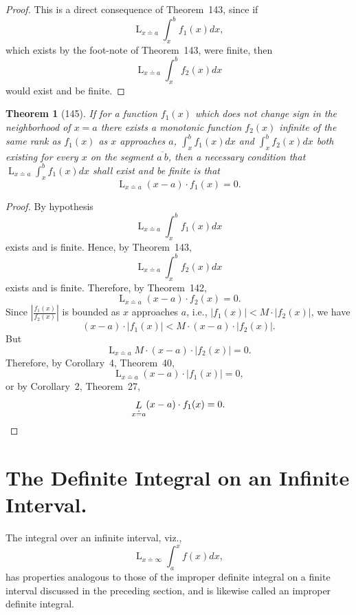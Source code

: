 \documentclass[a4paper,12pt]{book}[2004/02/16]
\providecommand{\hyperlink}[2]{#2}
\providecommand{\hypertarget}[2]{#2}
\theoremstyle{ilemma}
\theoremstyle{itheorem}
\newtheorem{theorem}{Theorem}
\theoremstyle{iother}
\theoremstyle{icorollary}
\theoremstyle{numcorollary}
\theoremstyle{idefinition}
\renewcommand{\dfrac}[2]{\frac{#1}{#2}}%
\begin{document}
\begin{proof}
This is a direct consequence of Theorem~\hyperlink{thm143}{143}, since if
\[
  \mathop{L}_{x\doteq a}\int_x^bf_1(x)dx,
\]
which exists by the foot-note of Theorem~\hyperlink{thm143}{143}, were finite, then
\[
  \mathop{L}_{x\doteq a}\int_x^bf_2(x)dx
\]
would exist and be finite.
\end{proof}

\begin{theorem}[145]\hypertarget{thm145}{}
If for a function $f_1(x)$ which does not change sign in the
neighborhood of $x=a$ there exists a monotonic function $f_2(x)$
infinite of the same rank as $f_1(x)$ as $x$ approaches $a$,
$\displaystyle \int_x^bf_1(x)dx$ and $\displaystyle \int_x^bf_2(x)dx$
both existing for every $x$ on the segment $\overline{a\ b}$, then a
necessary condition that $\displaystyle \mathop{L}_{x\doteq
a}\int_x^bf_1(x)dx$ shall exist and be finite is that
\[
  \mathop{L}_{x\doteq a}(x-a)\cdot f_1(x)=0.
\]
\end{theorem}

\begin{proof}
By hypothesis
\[
  \mathop{L}_{x\doteq a}\int_x^bf_1(x)dx
\]
exists and is finite. Hence, by Theorem~\hyperlink{thm143}{143},
\[
  \mathop{L}_{x\doteq a}\int_x^bf_2(x)dx
\]
exists and is finite. Therefore, by Theorem~\hyperlink{thm142}{142},
\[
  \mathop{L}_{x\doteq a}(x-a)\cdot f_2(x)=0.
\]
Since $ \left|\dfrac{f_1(x)}{f_2(x)}\right|$ is bounded as $x$
approaches $a$, i.e., $|f_1(x)|<M\cdot|f_2(x)|$, we have
\[
  (x-a)\cdot|f_1(x)|<M\cdot (x-a)\cdot|f_2(x)|.
\]
But
\[
  \mathop{L}_{x\doteq a} M \cdot (x-a)\cdot|f_2(x)|=0.
\]
Therefore, by Corollary~\hyperlink{cor4p82}{4}, Theorem~\hyperlink{thm40}{40},
\[
  \mathop{L}_{x\doteq a}(x-a)\cdot|f_1(x)|=0,
\]
or by Corollary~\hyperlink{cor2th27}{2}, Theorem~\hyperlink{thm27}{27},
\[
  \mathop{L}_{x\doteq a}(x-a)\cdot f_1(x)=0.\qedhere
\]
\end{proof}

\section{The Definite Integral on an Infinite Interval.}\hypertarget{chIXsec2}{}%

The integral over an infinite interval, viz.,
\[
  \mathop{L}_{x\doteq \infty}\int_a^xf(x)dx,
\]
has properties analogous to those of the improper definite integral on
a finite interval discussed in the preceding section, and is likewise
called an improper definite integral.
\end{document}
